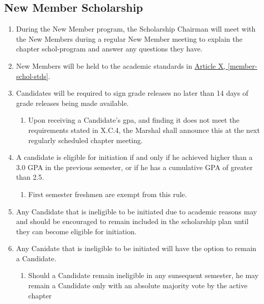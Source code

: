 \begin{enumerate}
\section{New Member Scholarship}
	\begin{enumerate}
		\item During the New Member program, the Scholarship Chairman will meet with the New Members during a regular New Member meeting to explain the chapter \Gls{schol-program} and answer any questions they have.
		
		\item New Members will be held to the academic standards in \hyperref[member-schol-stds]{Article X, \autoref*{member-schol-stds}}.

		\item Candidates will be required to sign grade releases no later than 14 days of grade releases being made available.

		\begin{enumerate}
			\item Upon receiving a Candidate's \gls{gpa}, and finding it does not meet the requirements stated in X.C.4, the Marshal shall announce this at the next regularly scheduled chapter meeting.
		\end{enumerate}
		
		\item A candidate is eligible for initiation if and only if he achieved higher than a 3.0 GPA in the previous semester, or if he has a cumulative GPA of greater than 2.5.
		
		\begin{enumerate}
			\item First semester freshmen are exempt from this rule.
		\end{enumerate}
		
		\item Any Candidate that is ineligible to be initiated due to academic reasons may and should be encouraged to remain included in the scholarship plan until they can become eligible for initiation.

		\item Any Canidate that is ineligible to be initiated will have the option to remain a Candidate.

		\begin{enumerate}
			\item Should a Candidate remain ineligible in any sunsequent semester, he may remain a Candidate only with an absolute majority vote by the active chapter
		\end{enumerate}


\end{enumerate}
\end{enumerate}
